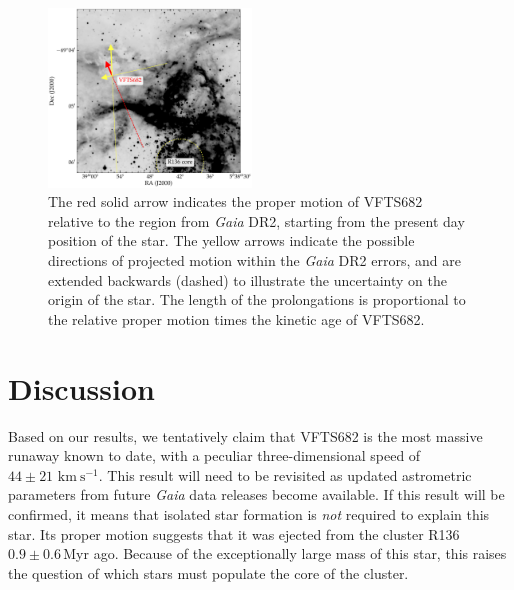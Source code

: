 \documentclass[a4paper,fleqn,usenatbib]{mnras}
\newcommand{\todo}[1]{{\large $\blacksquare$~\textbf{\color{red}[#1]}}~$\blacksquare$}
\newcommand{\kms}{{\,\mathrm{km\ s^{-1}}}}
\begin{document}
\begin{figure}%
  \centering
  \includegraphics[width=0.48\textwidth]{./figures/main_plot_good_gaia_only}  
  \caption{The red solid arrow indicates the proper motion of VFTS682
    relative to the region from \emph{Gaia} DR2, starting from the present day position of
    the star. The yellow arrows indicate the possible
    directions of projected motion within the \emph{Gaia} DR2 errors, and are extended
    backwards (dashed) to illustrate the uncertainty on the origin of the
    star. The length of the prolongations is proportional to the relative proper motion
    times the kinetic age of VFTS682.
  }
  
  \label{fig:main}
\end{figure}


\section{Discussion}
\label{sec:discussion}

Based on our results, we tentatively claim that VFTS682 is the most massive
runaway known to date, with a peculiar three-dimensional speed of
$44\pm21\,\kms$. This result will need to be revisited as updated
astrometric parameters from future \emph{Gaia} data releases become
available. If this result will be confirmed, it means that isolated star formation is
\emph{not} required to explain this star. Its proper motion suggests that it was ejected from the cluster R136
$0.9\pm0.6$\,Myr ago. Because of the exceptionally large mass
of this star, this raises the question of which stars must populate
the core of the cluster.
\end{document}
